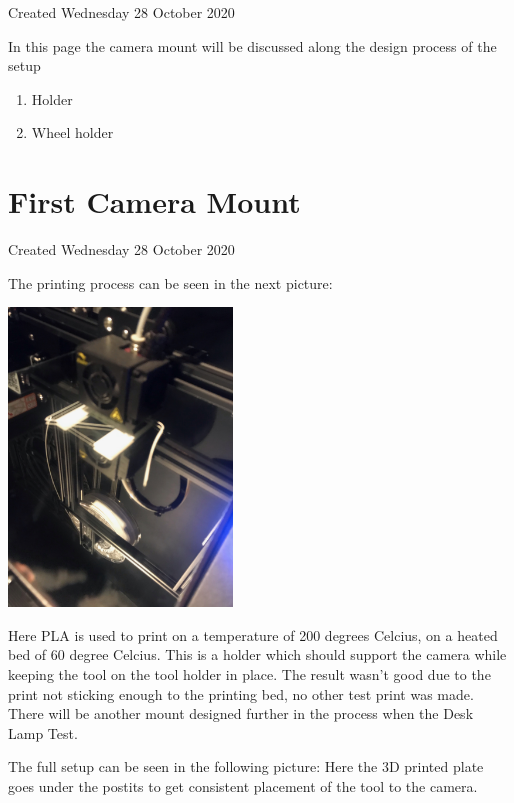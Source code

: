 \documentclass{article}
\begin{document}
Created Wednesday 28 October 2020



In this page the camera mount will be discussed along the design process of the setup



\begin{enumerate}[1]
\item Holder 
\item Wheel holder
\end{enumerate}

		\section{First Camera Mount}

Created Wednesday 28 October 2020



The printing process can be seen in the next picture:

\includegraphics[height=3.125000in, keepaspectratio=true]{./ZimFiles_files/Camera_setup/Camera_mount/First_Camera_Mount/3D_print_houder.jpeg}



Here PLA is used to print on a temperature of 200 degrees Celcius, on a heated bed of 60 degree Celcius. This is a holder which should support the camera while keeping the tool on the tool holder in place. The result wasn't good due to the print not sticking enough to the printing bed, no other test print was made. There will be another mount designed further in the process when the Desk Lamp Test.



The full setup can be seen in the following picture: Here the 3D printed plate goes under the postits to get consistent placement of the tool to the camera. 
\end{document}
